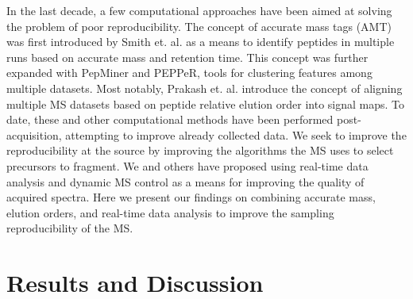 In the last decade, a few computational approaches have been aimed at solving the problem of poor reproducibility. The concept of accurate mass tags (AMT) was first introduced by Smith et. al. as a means to identify peptides in multiple runs based on accurate mass and retention time.\cite{smith} This concept was further expanded with PepMiner and PEPPeR, tools for clustering features among multiple datasets.\cite{pepminer,pepper} Most notably, Prakash et. al. introduce the concept of aligning multiple MS datasets based on peptide relative elution order into signal maps.\cite{prakash} To date, these and other computational methods\cite{radulovic,listgarten,shen,zhang,lin,bateman} have been performed post-acquisition, attempting to improve already collected data. We seek to improve the reproducibility at the source by improving the algorithms the MS uses to select precursors to fragment. We and others have proposed using real-time data analysis and dynamic MS control as a means for improving the quality of acquired spectra.\cite{inseq,graumann,webber} Here we present our findings on combining accurate mass, elution orders, and real-time data analysis to improve the sampling reproducibility of the MS.

\section{Results and Discussion}

